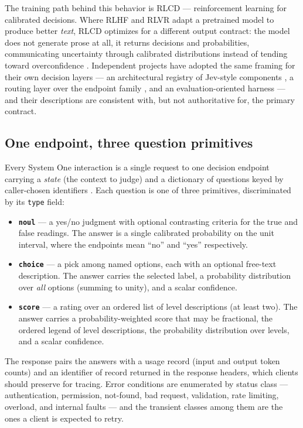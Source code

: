 \documentclass[
  english,
]{article}
\providecommand{\tightlist}{%
  \setlength{\itemsep}{0pt}\setlength{\parskip}{0pt}}
\begin{document}
The training path behind this behavior is RLCD --- reinforcement
learning for calibrated decisions. Where RLHF and RLVR adapt a
pretrained model to produce better \emph{text}, RLCD optimizes for a
different output contract: the model does not generate prose at all, it
returns decisions and probabilities, communicating uncertainty through
calibrated distributions instead of tending toward overconfidence
\citep{typesafe2026systemoneconcept}. Independent projects have adopted
the same framing for their own decision layers --- an architectural
registry of Jev-style components \citep{register2026jev}, a routing
layer over the endpoint family \citep{orcarouter2026jev}, and an
evaluation-oriented harness \citep{elsolitario2026jev} --- and their
descriptions are consistent with, but not authoritative for, the primary
contract.

\subsection{One endpoint, three question
primitives}\label{one-endpoint-three-question-primitives}

Every System One interaction is a single request to one decision
endpoint carrying a \emph{state} (the context to judge) and a dictionary
of questions keyed by caller-chosen identifiers
\citep{typesafe2026apidocs}. Each question is one of three primitives,
discriminated by its \texttt{type} field:

\begin{itemize}
\tightlist
\item
  \textbf{\texttt{noul}} --- a yes/no judgment with optional contrasting
  criteria for the true and false readings. The answer is a single
  calibrated probability on the unit interval, where the endpoints mean
  ``no'' and ``yes'' respectively.
\item
  \textbf{\texttt{choice}} --- a pick among named options, each with an
  optional free-text description. The answer carries the selected label,
  a probability distribution over \emph{all} options (summing to unity),
  and a scalar confidence.
\item
  \textbf{\texttt{score}} --- a rating over an ordered list of level
  descriptions (at least two). The answer carries a probability-weighted
  score that may be fractional, the ordered legend of level
  descriptions, the probability distribution over levels, and a scalar
  confidence.
\end{itemize}

The response pairs the answers with a usage record (input and output
token counts) and an identifier of record returned in the response
headers, which clients should preserve for tracing. Error conditions are
enumerated by status class --- authentication, permission, not-found,
bad request, validation, rate limiting, overload, and internal faults
--- and the transient classes among them are the ones a client is
expected to retry.
\end{document}
